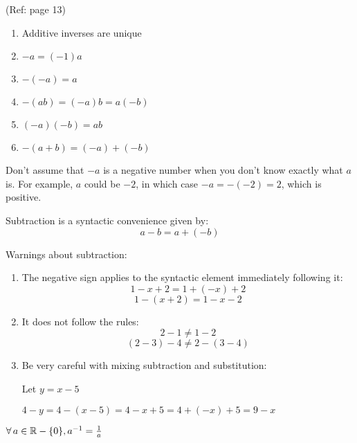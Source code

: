 \documentclass[letterpaper,12pt,fleqn]{article}
\begin{document}
\begin{properties}[Negatives]
  (Ref: page 13)
  \begin{enumerate}
  \item Additive inverses are unique
  \item $-a=(-1)a$
  \item $-(-a)=a$
  \item $-(ab)=(-a)b=a(-b)$
  \item $(-a)(-b)=ab$
  \item $-(a+b)=(-a)+(-b)$
  \end{enumerate}
\end{properties}

Don't assume that $-a$ is a negative number when you don't know exactly what
$a$ is. For example, $a$ could be $-2$, in which case $-a=-(-2)=2$, which is
positive.

\begin{definition}[Subtraction]
  Subtraction is a syntactic convenience given by:
  \[a-b=a+(-b)\]
\end{definition}

Warnings about subtraction:
\begin{enumerate}
\item The negative sign applies to the syntactic element immediately
  following it:
  \[1-x+2=1+(-x)+2\]
  \[1-(x+2)=1-x-2\]
\item It does not follow the rules:
  \[2-1\ne1-2\]
  \[(2-3)-4\ne2-(3-4)\]
\item Be very careful with mixing subtraction and substitution:
  
  Let $y=x-5$
  
  $4-y=4-(x-5)=4-x+5=4+(-x)+5=9-x$
\end{enumerate}

\begin{definition}[Inverse]
  $\forall\,a\in\mathbb{R}-\{0\},a^{-1}=\frac{1}{a}$
\end{definition}

\end{document}
